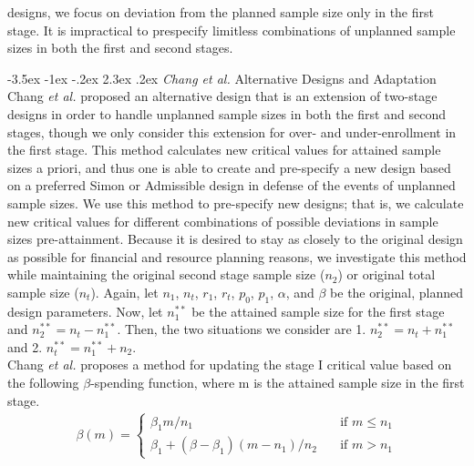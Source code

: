 \documentclass[12pt]{report}\usepackage[]{graphicx}\usepackage[]{color}
\makeatletter
\newlength{\li}\setlength{\li}{14.48pt}
\newlength{\di}\setlength{\di}{-3.5mm}
\renewcommand\section{ \@startsection {section}{1}{\z@}%
                                   {-3.5ex \@plus -1ex \@minus -.2ex}%
                                   {2.3ex \@plus.2ex}%
                                   {\centering\large\fontfamily{qcs}\selectfont}}
\makeatother
\begin{document}
designs, we focus on deviation from the planned sample size only in the first stage. It is impractical to prespecify limitless combinations of unplanned sample sizes in both the first and second stages.   

\section{\textit{Chang et al.} Alternative Designs and Adaptation}
Chang \textit{et al.} \cite{Chang} proposed an alternative design that is an extension of two-stage designs in order to handle unplanned sample sizes in both the first and second stages, though we only consider this extension for over- and under-enrollment in the first stage. This method calculates new critical values for attained sample sizes a priori, and thus one is able to create and pre-specify a new design based on a preferred Simon or Admissible design in defense of the events of unplanned sample sizes. We use this method to pre-specify new designs; that is, we calculate new critical values for different combinations of possible deviations in sample sizes pre-attainment. Because it is desired to stay as closely to the original design as possible for financial and resource planning reasons, we investigate this method while maintaining the original second stage sample size ($n_2$) or original total sample size ($n_t$). Again, let $n_1$, $n_t$, $r_1$, $r_t$, $p_0$, $p_1$, $\alpha$, and $\beta$ be the original, planned design parameters. Now, let $n_1^{\ast \ast}$ be the attained sample size for the first stage and $n_2^{\ast\ast} = n_t - n_1^{\ast\ast}$. Then, the two situations we consider are 1. $n_2^{\ast\ast} = n_t + n_1^{\ast\ast}$ and 2. $n_t^{\ast\ast} = n_1^{\ast\ast} + n_2$. \\
\indent Chang \textit{et al.} proposes a method for updating the stage I critical value based on the following $\beta$-spending function, where m is the attained sample size in the first stage.
\begin{equation}
\begin{aligned}
\beta(m) = \left\{
        \begin{array}{ll}
            \beta_1 m/n_1 & \quad \text{if } m\leq n_1 \\
            \beta_1 + (\beta - \beta_1)(m - n_1)/n_2 & \quad \text{if } m > n_1
        \end{array}
    \right.
\end{aligned}
\end{equation}
\end{document}
